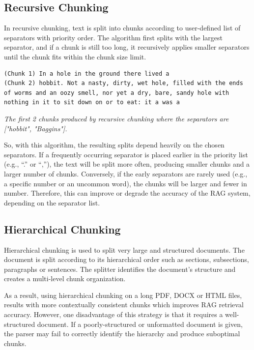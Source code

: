 \documentclass[conference]{IEEEtran}
\begin{document}
\subsection{Recursive Chunking}
In recursive chunking, text is split into chunks according to user-defined list of separators with priority order. The algorithm first splits with the largest separator, and if a chunk is still too long, it recursively applies smaller separators until the chunk fits within the chunk size limit.
\footnotesize
\begin{tcolorbox}[colback=gray!15, colframe=gray!75, arc=8mm]
\begin{lstlisting}[breaklines=true, columns=fullflexible]
(Chunk 1) In a hole in the ground there lived a
(Chunk 2) hobbit. Not a nasty, dirty, wet hole, filled with the ends of worms and an oozy smell, nor yet a dry, bare, sandy hole with nothing in it to sit down on or to eat: it a was a 
\end{lstlisting}
\end{tcolorbox}
\begin{center}
\textit{The first 2 chunks produced by recursive chunking where the separators are ["hobbit", "Baggins"].}
\end{center}
\normalsize
So, with this algorithm, the resulting splits depend heavily on the chosen separators. If a frequently occurring separator is placed earlier in the priority list (e.g., “.” or “,”), the text will be split more often, producing smaller chunks and a larger number of chunks. Conversely, if the early separators are rarely used (e.g., a specific number or an uncommon word), the chunks will be larger and fewer in number. Therefore, this can improve or degrade the accuracy of the RAG system, depending on the separator list.

\subsection{Hierarchical Chunking}
Hierarchical chunking is used to split very large and structured documents. The document is split according to its hierarchical order such as sections, subsections, paragraphs or sentences. The splitter identifies the document’s structure and creates a multi-level chunk organization.

As a result, using hierarchical chunking on a long PDF, DOCX or HTML files, results with more contextually consistent chunks which improves RAG retrieval accuracy. However, one disadvantage of this strategy is that it requires a well-structured document. If a poorly-structured or unformatted document is given, the parser may fail to correctly identify the hierarchy and produce suboptimal chunks.
\end{document}
